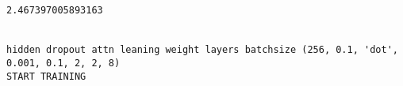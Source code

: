 \documentclass[11pt]{article}
\begin{document}
    \begin{center}
    \end{center}
    { \hspace*{\fill} \\}
    
    \begin{center}
    \end{center}
    { \hspace*{\fill} \\}
    
    \begin{center}
    \end{center}
    { \hspace*{\fill} \\}
    
    \begin{center}
    \end{center}
    { \hspace*{\fill} \\}
    
    \begin{Verbatim}[commandchars=\\\{\}]
2.467397005893163


hidden dropout attn leaning weight layers batchsize (256, 0.1, 'dot', 0.001, 0.1, 2, 2, 8)
START TRAINING



    \end{Verbatim}

    \begin{center}
    \end{center}
    { \hspace*{\fill} \\}
    
    \begin{center}
    \end{center}
    { \hspace*{\fill} \\}
    
    \begin{center}
    \end{center}
    { \hspace*{\fill} \\}
    
\end{document}
